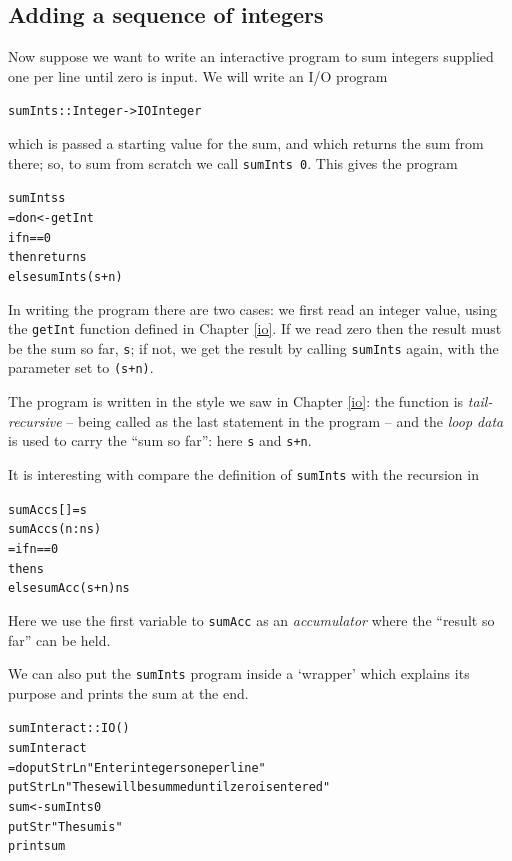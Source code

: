 \subsection*{Adding a sequence of integers}

Now suppose we want to write an interactive program to sum integers
supplied one per line until zero is input. We will write an I/O program
\begin{alltt}
sumInts :: Integer -> IO Integer
\end{alltt}
which is passed a starting value for the sum, and which returns the sum from there; so, to sum from scratch we call \texttt{sumInts 0}. This gives the program
\begin{alltt}
sumInts s
  = do n <- getInt
       if n==0 
          then return s
          else sumInts (s+n)
\end{alltt}
In writing the program there are two cases: we first read an integer value, using the \texttt{getInt} function defined in Chapter \ref{io}. If
we read zero then the result must be the sum so far, \texttt{s}; if not, we get the result by calling \texttt{sumInts} again, with the parameter set to \texttt{(s+n)}.



The program is written in the style we saw in Chapter \ref{io}: the function is \emph{tail-recursive} -- being called as the last statement in the program -- and the \emph{loop data} is used to carry the ``sum so far'': here \texttt{s} and \texttt{s+n}. 



It is interesting with compare the definition of \texttt{sumInts} with the recursion in
\begin{alltt}
sumAcc s [] = s
sumAcc s (n:ns) 
  = if n==0
       then s
       else sumAcc (s+n) ns
\end{alltt}
Here we use the first variable to \texttt{sumAcc} as an \emph{accumulator} where the ``result so far'' can be held. 

We can also put the \texttt{sumInts} program inside a `wrapper' which explains its
purpose and prints the sum at the end.
\begin{alltt}
sumInteract :: IO ()
sumInteract
  = do putStrLn "Enter integers one per line"
       putStrLn "These will be summed until zero is entered"
       sum <- sumInts 0
       putStr "The sum is "
       print sum
\end{alltt}


